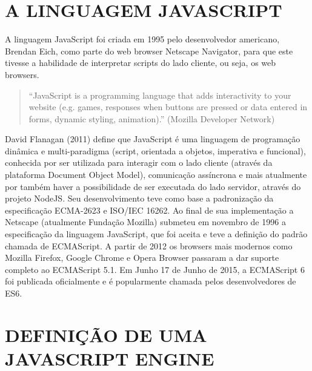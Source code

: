 \documentclass{article}
\begin{document}
\section{A LINGUAGEM JAVASCRIPT}

A linguagem JavaScript foi criada em 1995 pelo desenvolvedor americano, Brendan Eich,
como parte do web browser Netscape Navigator, para que este tivesse a habilidade de
interpretar scripts do lado cliente, ou seja, os web browsers.
\begin{quote}
“JavaScript is a programming language that adds interactivity to your
website (e.g. games, responses when buttons are pressed or data entered in
forms, dynamic styling, animation).” (Mozilla Developer Network)
\end{quote}

David Flanagan (2011) define que JavaScript é uma linguagem de programação dinâmica e
multi-paradigma (script, orientada a objetos, imperativa e funcional), conhecida por ser
utilizada para interagir com o lado cliente (através da plataforma Document Object Model),
comunicação assíncrona e mais atualmente por também haver a possibilidade de ser
executada do lado servidor, através do projeto NodeJS.
Seu desenvolvimento teve como base a padronização da especificação ECMA-2623 e
ISO/IEC 16262. Ao final de sua implementação a Netscape (atualmente Fundação Mozilla)
submeteu em novembro de 1996 a especificação da linguagem JavaScript, que foi aceita e
teve a definição do padrão chamada de ECMAScript. A partir de 2012 os browsers mais
modernos como Mozilla Firefox, Google Chrome e Opera Browser passaram a dar suporte
completo ao ECMAScript 5.1. Em Junho 17 de Junho de 2015, a ECMAScript 6 foi publicada
oficialmente e é popularmente chamada pelos desenvolvedores de ES6.

\section{DEFINIÇÃO DE UMA JAVASCRIPT ENGINE}
\end{document}
